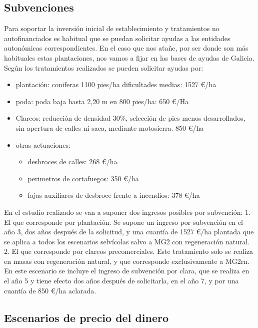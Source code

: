 \documentclass[]{article}
\providecommand{\tightlist}{%
  \setlength{\itemsep}{0pt}\setlength{\parskip}{0pt}}
\begin{document}
\subsection{Subvenciones}\label{subvenciones}

Para soportar la inversión inicial de establecimiento y tratamientos no
autofinanciados es habitual que se puedan solicitar ayudas a las
entidades autonómicas correspondientes. En el caso que nos atañe, por
ser donde son más habituales estas plantaciones, nos vamos a fijar en
las bases de ayudas de Galicia. Según los tratamientos realizados se
pueden solicitar ayudas por:

\begin{itemize}
\tightlist
\item
  plantación: coniferas 1100 pies/ha dificultades medias: 1527 \euro/ha
\item
  poda: poda baja hasta 2,20 m en 800 pies/ha: 650 \euro/Ha
\item
  Clareos: reducción de densidad 30\%, selección de pies menos
  desarrollados, sin apertura de calles ni saca, mediante motosierra.
  850 \euro/ha
\item
  otras actuaciones:

  \begin{itemize}
  \tightlist
  \item
    desbroces de calles: 268 \euro/ha
  \item
    perimetros de cortafuegos: 350 \euro/ha
  \item
    fajas auxiliares de desbroce frente a incendios: 378 \euro/ha
  \end{itemize}
\end{itemize}

En el estudio realizado se van a suponer dos ingresos posibles por
subvención: 1. El que corresponde por plantación. Se supone un ingreso
por subvención en el año 3, dos años después de la solicitud, y una
cuantía de 1527 \euro/ha plantada que se aplica a todos los escenarios
selvícolas salvo a MG2 con regeneración natural. 2. El que corresponde
por clareos precomerciales. Este tratamiento solo se realiza en masas
con regeneración natural, y que corresponde exclusivamente a MG2rn. En
este escenario se incluye el ingreso de subvención por clara, que se
realiza en el año 5 y tiene efecto dos años después de solicitarla, en
el año 7, y por una cuantía de 850 \euro/ha aclarada.

\subsection{Escenarios de precio del
dinero}\label{escenarios-de-precio-del-dinero}
\end{document}

